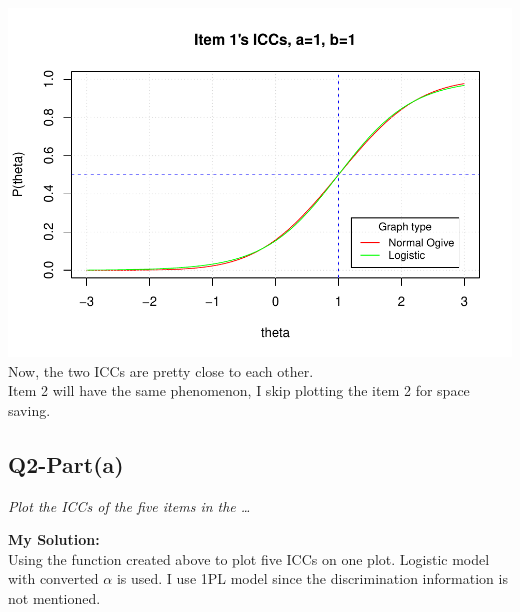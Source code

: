 \documentclass[
]{article}
\begin{document}
\includegraphics{Assignment_1_files/figure-latex/unnamed-chunk-8-1.pdf}
Now, the two ICCs are pretty close to each other.\\
Item 2 will have the same phenomenon, I skip plotting the item 2 for
space saving.

\hypertarget{q2-parta}{%
\subsection{Q2-Part(a)}\label{q2-parta}}

\emph{Plot the ICCs of the five items in the \ldots{}}

\textbf{My Solution: }\\
Using the function created above to plot five ICCs on one plot. Logistic
model with converted \(\alpha\) is used. I use 1PL model since the
discrimination information is not mentioned.
\end{document}
